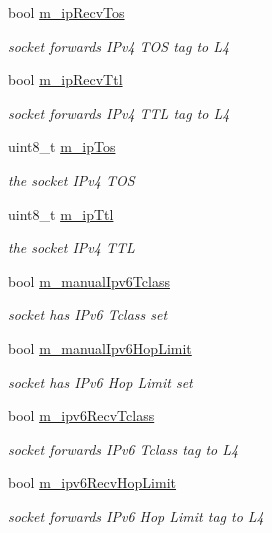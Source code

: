 \begin{DoxyCompactItemize}
bool \hyperlink{classns3_1_1Socket_a5fdcc70b383be1f5d4c2e9f5da7e549a}{m\+\_\+ip\+Recv\+Tos}
\begin{DoxyCompactList}\small\item\em socket forwards I\+Pv4 T\+OS tag to L4 \end{DoxyCompactList}\item 
bool \hyperlink{classns3_1_1Socket_aa742eaabf3d9afdc77710a698e6ec681}{m\+\_\+ip\+Recv\+Ttl}
\begin{DoxyCompactList}\small\item\em socket forwards I\+Pv4 T\+TL tag to L4 \end{DoxyCompactList}\item 
uint8\+\_\+t \hyperlink{classns3_1_1Socket_a14aa2460d254debfb638f454a6f4ab61}{m\+\_\+ip\+Tos}
\begin{DoxyCompactList}\small\item\em the socket I\+Pv4 T\+OS \end{DoxyCompactList}\item 
uint8\+\_\+t \hyperlink{classns3_1_1Socket_a42f3bc6364dd1fdf28272b8ce44745e2}{m\+\_\+ip\+Ttl}
\begin{DoxyCompactList}\small\item\em the socket I\+Pv4 T\+TL \end{DoxyCompactList}\item 
bool \hyperlink{classns3_1_1Socket_acb85c7152d0483f0e8650acd52a7fc72}{m\+\_\+manual\+Ipv6\+Tclass}
\begin{DoxyCompactList}\small\item\em socket has I\+Pv6 Tclass set \end{DoxyCompactList}\item 
bool \hyperlink{classns3_1_1Socket_a2edb76a5e05c19ef6b97fb2516dfbe58}{m\+\_\+manual\+Ipv6\+Hop\+Limit}
\begin{DoxyCompactList}\small\item\em socket has I\+Pv6 Hop Limit set \end{DoxyCompactList}\item 
bool \hyperlink{classns3_1_1Socket_a904b460d94a02efd910ca16099bef919}{m\+\_\+ipv6\+Recv\+Tclass}
\begin{DoxyCompactList}\small\item\em socket forwards I\+Pv6 Tclass tag to L4 \end{DoxyCompactList}\item 
bool \hyperlink{classns3_1_1Socket_a12d3f85537c5d62bfec29fb7d021a010}{m\+\_\+ipv6\+Recv\+Hop\+Limit}
\begin{DoxyCompactList}\small\item\em socket forwards I\+Pv6 Hop Limit tag to L4 \end{DoxyCompactList}\item 

\end{DoxyCompactItemize}

